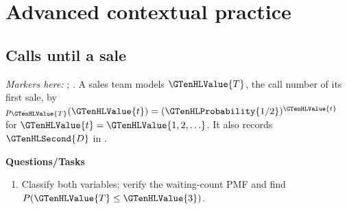 \section{Advanced contextual practice}\label{sec:t2-c1-advanced}


\subsection{Calls until a sale}
\label{subsec:t2-c1-calls-until-a-sale}
\textit{Markers here:} ; .
A sales team models $\GTenHLValue{T}$, the call number of its first sale, by $p_{\GTenHLValue{T}}(\GTenHLValue{t})=(\GTenHLProbability{1/2})^{\GTenHLValue{t}}$ for $\GTenHLValue{t}=\GTenHLValue{1,2,\ldots}$. It also records  $\GTenHLSecond{D}$ in .

\textbf{Questions/Tasks}
\begin{enumerate}
\item Classify both variables; verify the waiting-count PMF and find $P(\GTenHLValue{T}\leq\GTenHLValue{3})$.
\end{enumerate}
